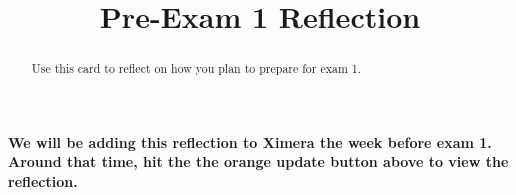 \documentclass{ximera}
\title[Dig-In:]{Pre-Exam 1 Reflection}
\begin{document}
\begin{abstract}
Use this card to reflect on how you plan to prepare for exam 1.
\end{abstract}
\maketitle

\textbf{We will be adding this reflection to Ximera the week before exam 1.  Around that time, hit the the orange update button above to view the reflection.}
\end{document}
